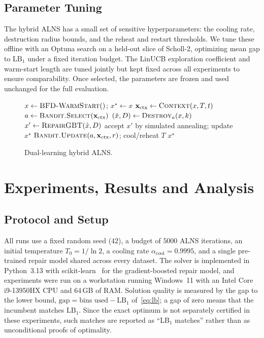 \documentclass[conference]{IEEEtran}
\begin{document}
\subsection{Parameter Tuning}
The hybrid ALNS has a small set of sensitive hyperparameters: the cooling rate,
destruction radius bounds, and the reheat and restart thresholds. We tune these
offline with an Optuna search on a held-out slice of Scholl-2, optimizing mean
gap to $\mathrm{LB}_1$ under a fixed iteration budget. The LinUCB exploration
coefficient and warm-start length are tuned jointly but kept fixed across all
experiments to ensure comparability. Once selected, the parameters are frozen and
used unchanged for the full evaluation.

\begin{figure}[t]
	\centering
	\begin{algorithmic}[1]
		\STATE $x \leftarrow \textsc{BFD-WarmStart}()$;\; $x^\star \leftarrow x$
		\STATE $\mathbf{x}_{\text{ctx}} \leftarrow \textsc{Context}(x,T,t)$
		\STATE $a \leftarrow \textsc{Bandit.Select}(\mathbf{x}_{\text{ctx}})$
		\STATE $(\hat{x},D) \leftarrow \textsc{Destroy}_a(x,k)$
		\STATE $x' \leftarrow \textsc{RepairGBT}(\hat{x},D)$
		\STATE accept $x'$ by simulated annealing; update $x^\star$
		\STATE $\textsc{Bandit.Update}(a,\mathbf{x}_{\text{ctx}},r)$;\; cool/reheat $T$
		\ENDFOR
		\RETURN $x^\star$
	\end{algorithmic}
	\caption{Dual-learning hybrid ALNS.}
	\label{alg:alns}
\end{figure}

\section{Experiments, Results and Analysis}\label{sec:experiments}

\subsection{Protocol and Setup}
All runs use a fixed random seed ($42$), a budget of $5000$ ALNS iterations, an
initial temperature $T_0=1/\ln 2$, a cooling rate $\alpha_{\mathrm{cool}}=0.9995$,
and a single pre-trained repair model shared across every dataset. The solver is
implemented in Python~3.13 with scikit-learn~\cite{bPedregosa} for the
gradient-boosted repair model, and experiments were run on a workstation running
Windows~11 with an Intel Core i9-13950HX CPU and 64\,GB of RAM. Solution quality
is measured by the gap to the lower bound,
$\text{gap}=\text{bins used}-\mathrm{LB}_1$ of~\eqref{eq:lb}; a gap of zero means
that the incumbent matches $\mathrm{LB}_1$. Since the exact optimum is not
separately certified in these experiments, such matches are reported as
``LB$_1$ matches'' rather than as unconditional proofs of optimality.
\end{document}
